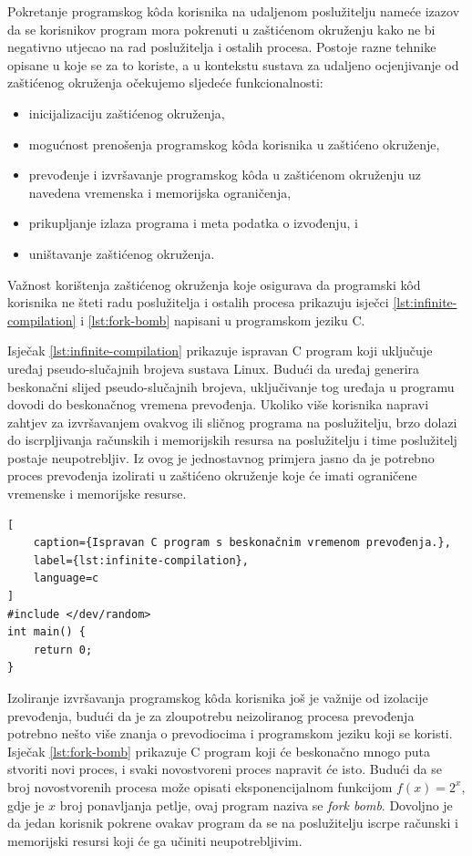 \documentclass[times, utf8, diplomski]{fer}
\begin{document}
Pokretanje programskog kôda korisnika na udaljenom poslužitelju nameće izazov da se korisnikov program mora pokrenuti u zaštićenom okruženju  kako ne bi negativno utjecao na rad poslužitelja i ostalih procesa. Postoje razne tehnike opisane u \citep{yi2014comparison} koje se za to koriste, a u kontekstu sustava za udaljeno ocjenjivanje od zaštićenog okruženja očekujemo sljedeće funkcionalnosti:
\begin{itemize}
    \item inicijalizaciju zaštićenog okruženja,
    \item mogućnost prenošenja programskog kôda korisnika u zaštićeno okruženje,
    \item prevođenje i izvršavanje programskog kôda u zaštićenom okruženju uz navedena vremenska i memorijska ograničenja,
    \item prikupljanje izlaza programa i meta podatka o izvođenju, i
    \item uništavanje zaštićenog okruženja.
\end{itemize}

Važnost korištenja zaštićenog okruženja koje osigurava da programski kôd korisnika ne šteti radu poslužitelja i ostalih procesa prikazuju isječci \ref{lst:infinite-compilation} i \ref{lst:fork-bomb} napisani u programskom jeziku C. 

Isječak \ref{lst:infinite-compilation} prikazuje ispravan C program koji uključuje uređaj pseudo-slučajnih brojeva sustava Linux. Budući da uređaj generira beskonačni slijed pseudo-slučajnih brojeva, uključivanje tog uređaja u programu dovodi do beskonačnog vremena prevođenja. Ukoliko više korisnika napravi zahtjev za izvršavanjem ovakvog ili sličnog programa na poslužitelju, brzo dolazi do iscrpljivanja računskih i memorijskih resursa na poslužitelju i time poslužitelj postaje neupotrebljiv.
Iz ovog je jednostavnog primjera jasno da je potrebno proces prevođenja izolirati u zaštićeno okruženje koje će imati ograničene vremenske i memorijske resurse.

\begin{lstlisting}[
    caption={Ispravan C program s beskonačnim vremenom prevođenja.},
    label={lst:infinite-compilation},
    language=c
]
#include </dev/random>
int main() {
    return 0;
}
\end{lstlisting}

Izoliranje izvršavanja programskog kôda korisnika još je važnije od izolacije prevođenja, budući da je za zloupotrebu neizoliranog procesa prevođenja potrebno nešto više znanja o prevodiocima i programskom jeziku koji se koristi. Isječak \ref{lst:fork-bomb} prikazuje C program koji će beskonačno mnogo puta stvoriti novi proces, i svaki novostvoreni proces napravit će isto. Budući da se broj novostvorenih procesa može opisati eksponencijalnom funkcijom $f(x) = 2^x$, gdje je $x$ broj ponavljanja petlje, ovaj program naziva se \textit{fork bomb}. Dovoljno je da jedan korisnik pokrene ovakav program da se na poslužitelju iscrpe računski i memorijski resursi koji će ga učiniti neupotrebljivim.
\end{document}

